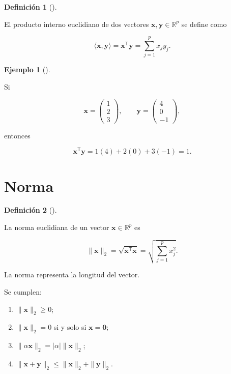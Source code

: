\documentclass[
  spanish,
  11pt,
  letterpaper,
  DIV=11,
  numbers=noendperiod]{scrreprt}
\providecommand{\tightlist}{%
  \setlength{\itemsep}{0pt}\setlength{\parskip}{0pt}}
\theoremstyle{definition}
\newtheorem{definition}{Definición}[chapter]
\theoremstyle{plain}
\theoremstyle{definition}
\newtheorem{example}{Ejemplo}[chapter]
\theoremstyle{remark}
\begin{document}
\begin{definition}[]\protect\hypertarget{def-producto-interno}{}\label{def-producto-interno}

El producto interno euclidiano de dos vectores
\(\mathbf{x},\mathbf{y}\in\mathbb{R}^{p}\) se define como

\[
\langle\mathbf{x},\mathbf{y}\rangle
=
\mathbf{x}^{\mathsf T}\mathbf{y}
=
\sum_{j=1}^{p}x_jy_j.
\]

\end{definition}

\begin{example}[]\protect\hypertarget{exm-producto-interno}{}\label{exm-producto-interno}

Si

\[
\mathbf{x}
=
\begin{pmatrix}
1\\
2\\
3
\end{pmatrix},
\qquad
\mathbf{y}
=
\begin{pmatrix}
4\\
0\\
-1
\end{pmatrix},
\]

entonces

\[
\mathbf{x}^{\mathsf T}\mathbf{y}
=
1(4)+2(0)+3(-1)
=
1.
\]

\end{example}

\section{Norma}\label{norma}

\begin{definition}[]\protect\hypertarget{def-norma-euclidiana}{}\label{def-norma-euclidiana}

La norma euclidiana de un vector \(\mathbf{x}\in\mathbb{R}^{p}\) es

\[
\|\mathbf{x}\|_2
=
\sqrt{
\mathbf{x}^{\mathsf T}\mathbf{x}
}
=
\sqrt{
\sum_{j=1}^{p}x_j^2
}.
\]

\end{definition}

La norma representa la longitud del vector.

Se cumplen:

\begin{enumerate}
\def\labelenumi{\arabic{enumi}.}
\tightlist
\item
  \(\|\mathbf{x}\|_2\geq 0\);
\item
  \(\|\mathbf{x}\|_2=0\) si y solo si \(\mathbf{x}=\mathbf{0}\);
\item
  \(\|\alpha\mathbf{x}\|_2=|\alpha|\|\mathbf{x}\|_2\);
\item
  \(\|\mathbf{x}+\mathbf{y}\|_2\leq\|\mathbf{x}\|_2+\|\mathbf{y}\|_2\).
\end{enumerate}
\end{document}
